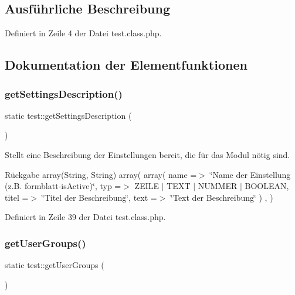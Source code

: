 \subsection{Ausführliche Beschreibung}


Definiert in Zeile 4 der Datei test.\+class.\+php.



\subsection{Dokumentation der Elementfunktionen}
\mbox{\label{classtest_a18863337810ed284f01173f3ba067a3b}} 
\subsubsection{\texorpdfstring{get\+Settings\+Description()}{getSettingsDescription()}}
{\footnotesize\ttfamily static test\+::get\+Settings\+Description (\begin{DoxyParamCaption}{ }\end{DoxyParamCaption})\hspace{0.3cm}{\ttfamily [static]}}

Stellt eine Beschreibung der Einstellungen bereit, die für das Modul nötig sind. \begin{DoxyReturn}{Rückgabe}
array(\+String, String) array( array( \textquotesingle{}name\textquotesingle{} =$>$ \char`\"{}\+Name der Einstellung (z.\+B. formblatt-\/is\+Active)\char`\"{}, \textquotesingle{}typ\textquotesingle{} =$>$ Z\+E\+I\+LE $\vert$ T\+E\+XT $\vert$ N\+U\+M\+M\+ER $\vert$ B\+O\+O\+L\+E\+AN, \textquotesingle{}titel\textquotesingle{} =$>$ \char`\"{}\+Titel der Beschreibung\char`\"{}, \textquotesingle{}text\textquotesingle{} =$>$ \char`\"{}\+Text der Beschreibung\char`\"{} ) , ) 
\end{DoxyReturn}


Definiert in Zeile 39 der Datei test.\+class.\+php.

\mbox{\label{classtest_ab813395b4d4ee67a1a63aa27ffa4f1ea}} 
\subsubsection{\texorpdfstring{get\+User\+Groups()}{getUserGroups()}}
{\footnotesize\ttfamily static test\+::get\+User\+Groups (\begin{DoxyParamCaption}{ }\end{DoxyParamCaption})\hspace{0.3cm}{\ttfamily [static]}}

